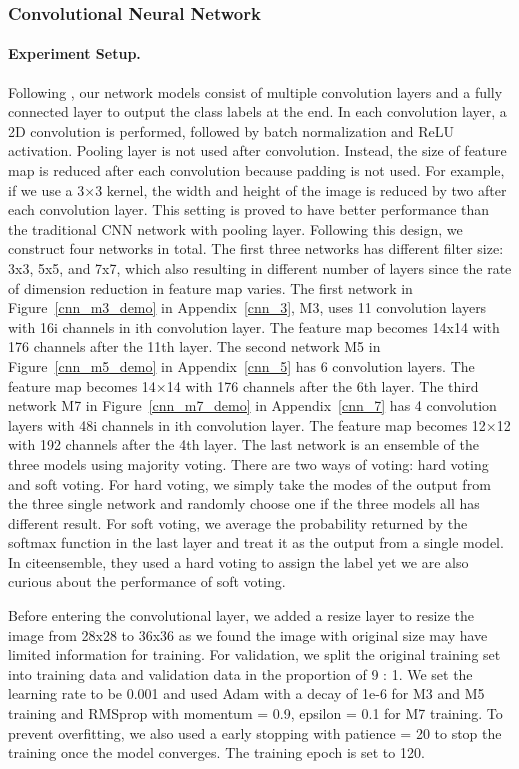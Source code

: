 \documentclass{article}
\begin{document}
\subsubsection{Convolutional Neural Network}
\paragraph{Experiment Setup. }
Following \cite{ensemble}, our network models consist of multiple convolution layers and a fully connected layer to output the class labels at the end. In each convolution layer, a 2D convolution is performed, followed by batch normalization and ReLU activation. Pooling layer is not used after convolution. Instead, the size of feature map is reduced after each convolution because padding is not used. For example, if we use a 3×3 kernel, the width and height of the image is reduced by two after each convolution layer. This setting is proved to have better performance than the traditional CNN network with pooling layer. Following this design, we construct four networks in total. The first three networks has different filter size: 3x3, 5x5, and 7x7, which also resulting in different number of layers since the rate of dimension reduction in feature map varies. The first network in Figure~\ref{cnn_m3_demo} in Appendix~\ref{cnn_3}, M3, uses 11 convolution layers with 16i channels in ith convolution layer. The feature map becomes 14x14 with 176 channels after the 11th layer. The second network M5 in Figure~\ref{cnn_m5_demo} in Appendix~\ref{cnn_5} has 6 convolution layers. The feature map becomes 14×14 with 176 channels after the 6th layer. The third network M7 in Figure~\ref{cnn_m7_demo} in Appendix~\ref{cnn_7} has 4 convolution layers with 48i channels in ith convolution layer. The feature map becomes 12×12 with 192 channels after the 4th layer. The last network is an ensemble of the three models using majority voting. There are two ways of voting: hard voting and soft voting. For hard voting, we simply take the modes of the output from the three single network and randomly choose one if the three models all has different result. For soft voting, we average the probability returned by the softmax function in the last layer and treat it as the output from a single model. In cite{ensemble}, they used a hard voting to assign the label yet we are also curious about the performance of soft voting.

Before entering the convolutional layer, we added a resize layer to resize the image from 28x28 to 36x36 as we found the image with original size may have limited information for training. For validation, we split the original training set into training data and validation data in the proportion of 9 : 1. We set the learning rate to be 0.001 and used Adam with a decay of 1e-6 for M3 and M5 training and RMSprop with momentum = 0.9, epsilon = 0.1 for M7 training. To prevent overfitting, we also used a early stopping with patience = 20 to stop the training once the model converges. The training epoch is set to 120.
\end{document}
